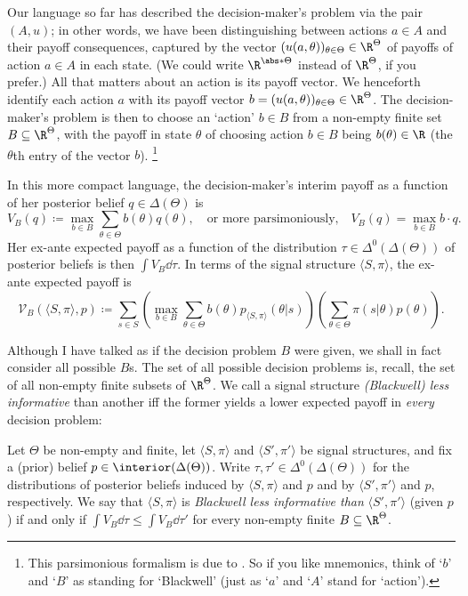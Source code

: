 Our language so far has described the decision-maker's problem via the pair $(A,u)$; in other words, we have been distinguishing between actions $a \in A$ and their payoff consequences, captured by the vector $( u(a,\theta) )_{\theta \in \Theta} \in \R^\Theta$ of payoffs of action $a \in A$ in each state. (We could write $\R^{\abs*{\Theta}}$ instead of $\R^\Theta$, if you prefer.) All that matters about an action is its payoff vector. We henceforth identify each action $a$ with its payoff vector $b = (u(a,\theta))_{\theta \in \Theta} \in \R^\Theta$. The decision-maker's problem is then to choose an `action' $b \in B$ from a non-empty finite set $B \subseteq \R^\Theta$, with the payoff in state $\theta$ of choosing action $b \in B$ being $b(\theta) \in \R$ (the $\theta$th entry of the vector $b$).%
	\footnote{This parsimonious formalism is due to \textcite{Blackwell1951,Blackwell1953}. So if you like mnemonics, think of `$b$' and `$B$' as standing for `Blackwell' (just as `$a$' and `$A$' stand for `action').}

In this more compact language, the decision-maker's interim payoff as a function of her posterior belief $q \in \Delta(\Theta)$ is
%
\begin{equation*}
	V_B(q) \coloneqq \max_{b \in B} \sum_{\theta \in \Theta} b(\theta) q(\theta) ,
	\quad \text{or more parsimoniously,} \quad
	V_B(q) = \max_{b \in B} b \cdot q .
\end{equation*}
%
Her ex-ante expected payoff as a function of the distribution $\tau \in \Delta^0(\Delta(\Theta))$ of posterior beliefs is then $\int V_B \dd \tau$. In terms of the signal structure $\langle S, \pi \rangle $, the ex-ante expected payoff is
%
\begin{equation*}
	\mathcal{V}_B(\langle S, \pi \rangle , p)
	\coloneqq \sum_{s \in S} \left( \max_{b \in B} \sum_{\theta \in \Theta} b(\theta) p_{\langle S, \pi \rangle }(\theta|s) \right)
	\left( \sum_{\theta \in \Theta} \pi(s|\theta) p(\theta) \right) .
\end{equation*}


Although I have talked as if the decision problem $B$ were given, we shall in fact consider all possible $B$s. The set of all possible decision problems is, recall, the set of all non-empty finite subsets of $\R^\Theta$. We call a signal structure \emph{(Blackwell) less informative} than another iff the former yields a lower expected payoff in \emph{every} decision problem:

\begin{definition}
	\label{definition:moreinfo}
	Let $\Theta$ be non-empty and finite, let $\langle S, \pi \rangle $ and $\langle S', \pi' \rangle $ be signal structures, and fix a (prior) belief $p \in \interior(\Delta(\Theta))$. Write $\tau,\tau' \in \Delta^0(\Delta(\Theta))$ for the distributions of posterior beliefs induced by $\langle S, \pi \rangle $ and $p$ and by $\langle S', \pi' \rangle $ and $p$, respectively. We say that $\langle S, \pi \rangle $ is \emph{Blackwell less informative than} $\langle S', \pi' \rangle $ (given $p$) if and only if $\int V_B \dd \tau \leq \int V_B \dd \tau'$ for every non-empty finite $B \subseteq \R^\Theta$.
\end{definition}

